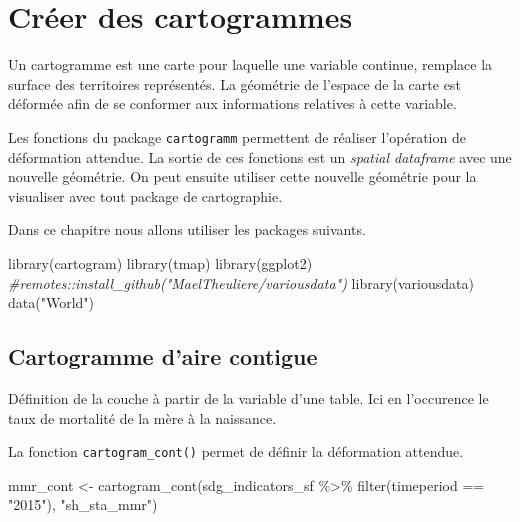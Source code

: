 \documentclass[
]{book}
\newenvironment{Shaded}{\begin{snugshade}}{\end{snugshade}}
\newcommand{\CommentTok}[1]{\textcolor[rgb]{0.56,0.35,0.01}{\textit{#1}}}
\newcommand{\FunctionTok}[1]{\textcolor[rgb]{0.00,0.00,0.00}{#1}}
\newcommand{\NormalTok}[1]{#1}
\newcommand{\OtherTok}[1]{\textcolor[rgb]{0.56,0.35,0.01}{#1}}
\newcommand{\SpecialCharTok}[1]{\textcolor[rgb]{0.00,0.00,0.00}{#1}}
\newcommand{\StringTok}[1]{\textcolor[rgb]{0.31,0.60,0.02}{#1}}
\begin{document}
\hypertarget{cruxe9er-des-cartogrammes}{%
\chapter{Créer des cartogrammes}\label{cruxe9er-des-cartogrammes}}

Un cartogramme est une carte pour laquelle une variable continue, remplace la surface des territoires représentés. La géométrie de l'espace de la carte est déformée afin de se conformer aux informations relatives à cette variable.

Les fonctions du package \texttt{cartogramm} permettent de réaliser l'opération de déformation attendue. La sortie de ces fonctions est un \emph{spatial dataframe} avec une nouvelle géométrie. On peut ensuite utiliser cette nouvelle géométrie pour la visualiser avec tout package de cartographie.

Dans ce chapitre nous allons utiliser les packages suivants.

\begin{Shaded}
\begin{Highlighting}[]
\FunctionTok{library}\NormalTok{(cartogram)}
\FunctionTok{library}\NormalTok{(tmap)}
\FunctionTok{library}\NormalTok{(ggplot2)}
\CommentTok{\#remotes::install\_github("MaelTheuliere/variousdata")}
\FunctionTok{library}\NormalTok{(variousdata)}
\FunctionTok{data}\NormalTok{(}\StringTok{"World"}\NormalTok{)}
\end{Highlighting}
\end{Shaded}

\hypertarget{cartogramme-daire-contigue}{%
\section{Cartogramme d'aire contigue}\label{cartogramme-daire-contigue}}

Définition de la couche à partir de la variable d'une table. Ici en l'occurence le taux de mortalité de la mère à la naissance.

La fonction \texttt{cartogram\_cont()} permet de définir la déformation attendue.

\begin{Shaded}
\begin{Highlighting}[]
\NormalTok{mmr\_cont }\OtherTok{\textless{}{-}} \FunctionTok{cartogram\_cont}\NormalTok{(sdg\_indicators\_sf }\SpecialCharTok{\%\textgreater{}\%} 
                 \FunctionTok{filter}\NormalTok{(timeperiod }\SpecialCharTok{==} \StringTok{"2015"}\NormalTok{),}
               \StringTok{"sh\_sta\_mmr"}\NormalTok{)}
\end{Highlighting}
\end{Shaded}
\end{document}
